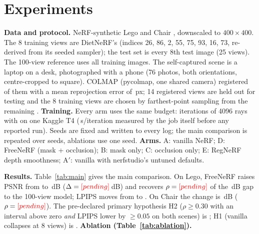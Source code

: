 \section{Experiments}
\textbf{Data and protocol.} NeRF-synthetic Lego and Chair \cite{mildenhall2020nerf}, downscaled to $400\times400$. The 8 training views are DietNeRF's \cite{jain2021dietnerf} (indices 26, 86, 2, 55, 75, 93, 16, 73, re-derived from its seeded sampler); the test set is every 8th test image (25 views). The 100-view reference uses all training images. The self-captured scene is a laptop on a desk, photographed with a phone (76 photos, both orientations, centre-cropped to square). COLMAP (pycolmap, one shared camera) registered \RealRegistered{} of them with a mean reprojection error of \RealReproj\,px; 14 registered views are held out for testing and the 8 training views are chosen by farthest-point sampling from the remaining \RealPool.
\textbf{Training.} Every arm uses the same budget: \Iters{} iterations of 4096 rays with \AmpText{} on one Kaggle T4 (\SPerIter\,s/iteration measured by the job itself before any reported run). Seeds are fixed and written to every log; the main comparison is repeated over \MainSeeds{} seeds, ablations use one seed.
\textbf{Arms.} A: vanilla NeRF; D: FreeNeRF (mask + occlusion); B: mask only; C: occlusion only; E: RegNeRF depth smoothness; A$'$: vanilla with nerfstudio's untuned defaults.

\begin{table}[t]\centering\small
\caption{Main result at 8 input views (mean$\pm$std over seeds; 25 held-out test views per synthetic scene). $\rho_\mathrm{PSNR}$ is the fraction of the 100-to-8-view PSNR gap recovered by FreeNeRF (Eq.~\ref{eq:rho}) with a two-level paired bootstrap 95\% interval. All numbers are generated from \texttt{results/runs/*.json}.}
\label{tab:main}
\end{table}

\begin{table}[t]\centering\footnotesize
\caption{Ablation at 8 views, seed 0: FreeNeRF's two terms alone (B, C) and together (D), the RegNeRF comparator (E) and the untuned baseline (A$'$). $\Omega_M$: share of rendering weight in the first 20 samples; $B$: background opacity.}
\label{tab:ablation}
\end{table}

\textbf{Results.} Table~\ref{tab:main} gives the main comparison. On Lego, FreeNeRF raises PSNR from \LegoAPsnr{} to \LegoDPsnr\,dB ($\Delta=\textcolor{red}{[pending]}$\,dB) and recovers $\rho=\textcolor{red}{[pending]}$ of the \LegoGap\,dB gap to the 100-view model; LPIPS moves from \LegoALpips{} to \LegoDLpips. On Chair the change is \ChairDpsnr\,dB ($\rho=\textcolor{red}{[pending]}$). The pre-declared primary hypothesis H2 ($\rho\ge0.30$ with an interval above zero \emph{and} LPIPS lower by $\ge0.05$ on both scenes) is \textbf{\HTwoStatus}; H1 (vanilla collapses at 8 views) is \HOneStatus. \RealSentence
\textbf{Ablation (Table~\ref{tab:ablation}).} \AblationSentence
